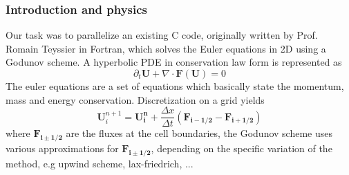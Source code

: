 \documentclass{beamer}
\begin{document}
%
%
%
\begin{frame}
\frametitle{Introduction and physics}
\justify
Our task was to parallelize an existing C code, originally written by Prof. Romain Teyssier in Fortran, which solves the Euler equations in 2D using a Godunov scheme. A hyperbolic PDE in conservation law form is represented as
\begin{equation}
\partial_t\mathbf{U} + \nabla\cdot\mathbf{F(U)} = 0
\label{eq:bb}
\end{equation}
The euler equations are a set of equations which basically state the momentum, mass and energy conservation. Discretization on a grid yields
\begin{equation}
\mathbf{U}^{n+1}_i=\mathbf{U^n_i}+\frac{\Delta x}{\Delta t}(\mathbf{F_{i-1/2}}-\mathbf{F_{i+1/2}})
\label{eq:bc}
\end{equation}
where $\mathbf{F_{i\pm1/2}}$ are the fluxes at the cell boundaries, the Godunov scheme uses various approximations for $\mathbf{F_{i\pm1/2}}$, depending on the specific variation of the method, e.g upwind scheme, lax-friedrich, ...
\vspace{1mm}

\end{frame}
\end{document}
